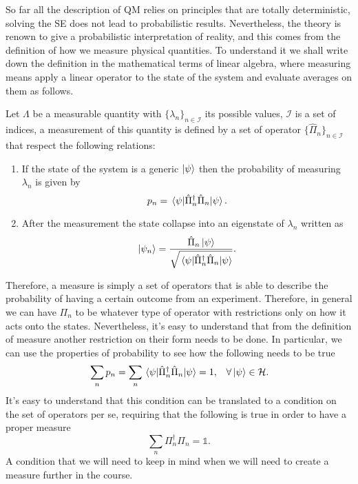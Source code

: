 So far all the description of QM relies on principles that are totally deterministic, solving the SE does not lead to probabilistic results. Nevertheless, the theory is renown to give a probabilistic interpretation of reality, and this comes from the definition of how we measure physical quantities. To understand it we shall write down the definition in the mathematical terms of linear algebra, where measuring means apply a linear operator to the state of the system and evaluate averages on them as follows.
{
    \label{def:measure}
    Let $\Lambda$ be a measurable quantity with $\{ \lambda_n \}_{n\in \mathcal{I}}$ its possible values, $\mathcal{I}$ is a set of indices, a measurement of this quantity is defined by a set of operator $\{ \hat{\Pi}_n \}_{n\in \mathcal{I}}$ that respect the following relations:
    \begin{enumerate}
        \item If the state of the system is a generic $\ket{\psi}$ then the probability of measuring $\lambda_n$ is given by
            \begin{equation}
                p_n = \ev{\hat{\Pi}^\dagger_n\hat{\Pi}_n}{\psi}.
            \end{equation}
        \item After the measurement the state collapse into an eigenstate of $\lambda_n$ written as
            \begin{equation}
                \ket{\psi_n} = \frac{\hat{\Pi}_n\ket{\psi}}{\sqrt{\ev{\hat{\Pi}^\dagger_n\hat{\Pi}_n}{\psi}}}.
            \end{equation}
    \end{enumerate}
}
\noindent
Therefore, a measure is simply a set of operators that is able to describe the probability of having a certain outcome from an experiment. Therefore, in general we can have $\Pi_n$ to be whatever type of operator with restrictions only on how it acts onto the states. Nevertheless, it's easy to understand that from the definition of measure another restriction on their form needs to be done. In particular, we can use the properties of probability to see how the following needs to be true
\begin{align}
    &\sum_n p_n = \sum_n \ev{\hat{\Pi}^\dagger_n\hat{\Pi}_n}{\psi} = 1, & \forall \ket{\psi} \in \mathcal{H}.
\end{align}
It's easy to understand that this condition can be translated to a condition on the set of operators per se, requiring that the following is true in order to have a proper measure
\begin{equation}
    \label{eq:MeasureCompleteCondition}
    \sum_n \Pi_n^\dagger \Pi_n = \mathbb{1}.
\end{equation}
A condition that we will need to keep in mind when we will need to create a measure further in the course.

